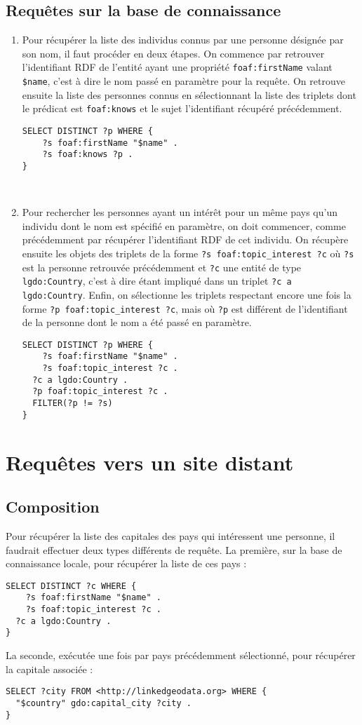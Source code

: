 \documentclass[a4paper,11pt]{article}
\begin{document}
\subsection{Requêtes sur la base de connaissance}
\begin{enumerate}
	\item Pour récupérer la liste des individus connus par une personne désignée par son nom, il faut procéder en deux étapes.
	On commence par retrouver l'identifiant RDF de l'entité ayant une propriété \lstinline$foaf:firstName$ valant \lstinline!$name!, c'est à dire le nom passé en paramètre pour la requête.
	On retrouve ensuite la liste des personnes connus en sélectionnant la liste des triplets dont le prédicat est \lstinline$foaf:knows$ et le sujet l'identifiant récupéré précédemment.
	\begin{lstlisting}[language=SPARQL]
SELECT DISTINCT ?p WHERE {
	?s foaf:firstName "$name" .
	?s foaf:knows ?p .
}
	\end{lstlisting}
	~\\\vspace*{-.5cm}
	\item Pour rechercher les personnes ayant un intérêt pour un même pays qu'un individu dont le nom est spécifié en paramètre, on doit commencer, comme précédemment par récupérer l'identifiant RDF de cet individu.
	On récupère ensuite les objets des triplets de la forme \lstinline$?s foaf:topic_interest ?c$ où \lstinline$?s$ est la personne retrouvée précédemment et \lstinline$?c$ une entité de type \lstinline$lgdo:Country$, c'est à dire étant impliqué dans un triplet \lstinline$?c a lgdo:Country$.
	Enfin, on sélectionne les triplets respectant encore une fois la forme \lstinline$?p foaf:topic_interest ?c$, mais où \lstinline$?p$ est différent de l'identifiant de la personne dont le nom a été passé en paramètre.
		\begin{lstlisting}[language=SPARQL]
SELECT DISTINCT ?p WHERE {
	?s foaf:firstName "$name" .
	?s foaf:topic_interest ?c .
  ?c a lgdo:Country .
  ?p foaf:topic_interest ?c .
  FILTER(?p != ?s)
}
	\end{lstlisting}
\end{enumerate}

\section{Requêtes vers un site distant}
\subsection{Composition}
Pour récupérer la liste des capitales des pays qui intéressent une personne, il faudrait effectuer deux types différents de requête.
La première, sur la base de connaissance locale, pour récupérer la liste de ces pays :
\begin{lstlisting}[language=SPARQL]
SELECT DISTINCT ?c WHERE {
	?s foaf:firstName "$name" .
	?s foaf:topic_interest ?c .
  ?c a lgdo:Country .
}
\end{lstlisting}

La seconde, exécutée une fois par pays précédemment sélectionné, pour récupérer la capitale associée :
\begin{lstlisting}[language=SPARQL]
SELECT ?city FROM <http://linkedgeodata.org> WHERE { 
  "$country" gdo:capital_city ?city .
} 
\end{lstlisting}
\end{document}
